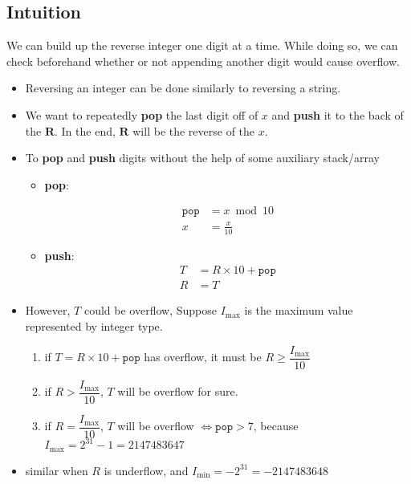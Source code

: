 \documentclass[a4paper,12pt]{article}
\begin{document}
\subsection{Intuition}
We can build up the reverse integer one digit at a time. While doing so, we can check beforehand whether or not appending another digit would cause overflow.
\begin{itemize}
\item Reversing an integer can be done similarly to reversing a string.
\item We want to repeatedly \textbf{pop} the last digit off of $x$ and \textbf{push} it to the back of the $\mathbf{R}$. In the end, $\mathbf{R}$ will be the reverse of the $x$.
\item To \textbf{pop} and \textbf{push} digits without the help of some auxiliary stack/array
\begin{itemize}
\item \textbf{pop}: 

\begin{align*}
\mathtt{pop} &= x \bmod 10 \\
x &= \frac{x}{10}
\end{align*}

\item \textbf{push}:
\begin{align*}
T &= R \times 10 + \mathtt{pop} \\
R &= T
\end{align*}
\end{itemize}
\item However, $T$ could be overflow, Suppose $I_{\max}$ is the maximum value represented by integer type.
\begin{enumerate}
\item if $T = R \times 10 + \mathtt{pop}$ has overflow, it must be $R \geq \dfrac{I_{\max}}{10}$
\item if $R > \dfrac{I_{\max}}{10} $, $T$ will be overflow for sure.
\item if $R = \dfrac{I_{\max}}{10}$, $T$ will be overflow $\iff \mathtt{pop} > 7$, because $I_{\max} = 2^{31} - 1 = 2147483647$
\end{enumerate}
\item similar when $R$ is underflow, and $I_{\min} = -2^{31} = -2147483648$
\end{itemize}
\end{document}
